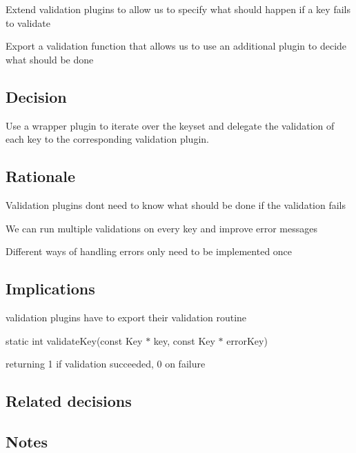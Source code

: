 \begin{DoxyItemize}
\item Extend validation plugins to allow us to specify what should happen if a key fails to validate
\item Export a validation function that allows us to use an additional plugin to decide what should be done
\end{DoxyItemize}

\subsection*{Decision}

Use a wrapper plugin to iterate over the keyset and delegate the validation of each key to the corresponding validation plugin.

\subsection*{Rationale}


\begin{DoxyItemize}
\item Validation plugins don\textquotesingle{}t need to know what should be done if the validation fails
\item We can run multiple validations on every key and improve error messages
\item Different ways of handling errors only need to be implemented once
\end{DoxyItemize}

\subsection*{Implications}

validation plugins have to export their validation routine

{\ttfamily static int validate\+Key(const Key $\ast$ key, const Key $\ast$ error\+Key)}

returning 1 if validation succeeded, 0 on failure

\subsection*{Related decisions}

\subsection*{Notes}